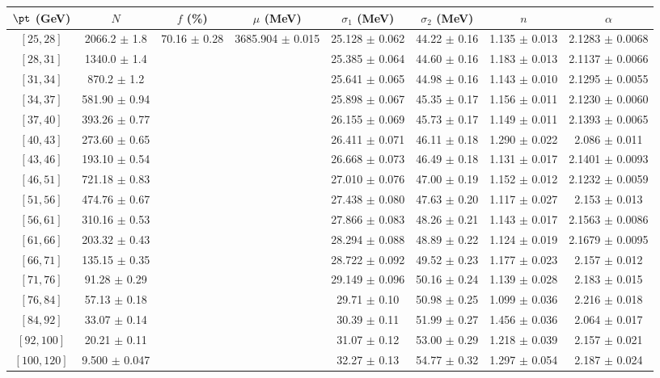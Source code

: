 \begin{tabular}{c||c|c|c|c|c|c|c}
$\pt$ (GeV) & $N$ & $f$ (\%) & $\mu$ (MeV) & $\sigma_1$ (MeV) & $\sigma_2$ (MeV) & $n$ & $\alpha$ \\
\hline
$[25, 28]$ & 2066.2 $\pm$ 1.8 & \multirow{17}{*}{70.16 $\pm$ 0.28} & \multirow{17}{*}{3685.904 $\pm$ 0.015} & 25.128 $\pm$ 0.062 & 44.22 $\pm$ 0.16 & 1.135 $\pm$ 0.013 & 2.1283 $\pm$ 0.0068\\
$[28, 31]$ & 1340.0 $\pm$ 1.4 &  &  & 25.385 $\pm$ 0.064 & 44.60 $\pm$ 0.16 & 1.183 $\pm$ 0.013 & 2.1137 $\pm$ 0.0066\\
$[31, 34]$ & 870.2 $\pm$ 1.2 &  &  & 25.641 $\pm$ 0.065 & 44.98 $\pm$ 0.16 & 1.143 $\pm$ 0.010 & 2.1295 $\pm$ 0.0055\\
$[34, 37]$ & 581.90 $\pm$ 0.94 &  &  & 25.898 $\pm$ 0.067 & 45.35 $\pm$ 0.17 & 1.156 $\pm$ 0.011 & 2.1230 $\pm$ 0.0060\\
$[37, 40]$ & 393.26 $\pm$ 0.77 &  &  & 26.155 $\pm$ 0.069 & 45.73 $\pm$ 0.17 & 1.149 $\pm$ 0.011 & 2.1393 $\pm$ 0.0065\\
$[40, 43]$ & 273.60 $\pm$ 0.65 &  &  & 26.411 $\pm$ 0.071 & 46.11 $\pm$ 0.18 & 1.290 $\pm$ 0.022 & 2.086 $\pm$ 0.011\\
$[43, 46]$ & 193.10 $\pm$ 0.54 &  &  & 26.668 $\pm$ 0.073 & 46.49 $\pm$ 0.18 & 1.131 $\pm$ 0.017 & 2.1401 $\pm$ 0.0093\\
$[46, 51]$ & 721.18 $\pm$ 0.83 &  &  & 27.010 $\pm$ 0.076 & 47.00 $\pm$ 0.19 & 1.152 $\pm$ 0.012 & 2.1232 $\pm$ 0.0059\\
$[51, 56]$ & 474.76 $\pm$ 0.67 &  &  & 27.438 $\pm$ 0.080 & 47.63 $\pm$ 0.20 & 1.117 $\pm$ 0.027 & 2.153 $\pm$ 0.013\\
$[56, 61]$ & 310.16 $\pm$ 0.53 &  &  & 27.866 $\pm$ 0.083 & 48.26 $\pm$ 0.21 & 1.143 $\pm$ 0.017 & 2.1563 $\pm$ 0.0086\\
$[61, 66]$ & 203.32 $\pm$ 0.43 &  &  & 28.294 $\pm$ 0.088 & 48.89 $\pm$ 0.22 & 1.124 $\pm$ 0.019 & 2.1679 $\pm$ 0.0095\\
$[66, 71]$ & 135.15 $\pm$ 0.35 &  &  & 28.722 $\pm$ 0.092 & 49.52 $\pm$ 0.23 & 1.177 $\pm$ 0.023 & 2.157 $\pm$ 0.012\\
$[71, 76]$ & 91.28 $\pm$ 0.29 &  &  & 29.149 $\pm$ 0.096 & 50.16 $\pm$ 0.24 & 1.139 $\pm$ 0.028 & 2.183 $\pm$ 0.015\\
$[76, 84]$ & 57.13 $\pm$ 0.18 &  &  & 29.71 $\pm$ 0.10 & 50.98 $\pm$ 0.25 & 1.099 $\pm$ 0.036 & 2.216 $\pm$ 0.018\\
$[84, 92]$ & 33.07 $\pm$ 0.14 &  &  & 30.39 $\pm$ 0.11 & 51.99 $\pm$ 0.27 & 1.456 $\pm$ 0.036 & 2.064 $\pm$ 0.017\\
$[92, 100]$ & 20.21 $\pm$ 0.11 &  &  & 31.07 $\pm$ 0.12 & 53.00 $\pm$ 0.29 & 1.218 $\pm$ 0.039 & 2.157 $\pm$ 0.021\\
$[100, 120]$ & 9.500 $\pm$ 0.047 &  &  & 32.27 $\pm$ 0.13 & 54.77 $\pm$ 0.32 & 1.297 $\pm$ 0.054 & 2.187 $\pm$ 0.024\\
\end{tabular}
